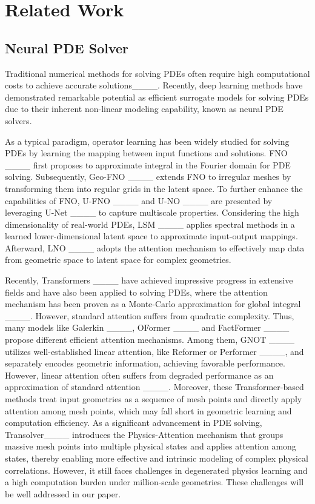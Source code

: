 \section{Related Work}
\vspace{-2pt}
\subsection{Neural PDE Solver}
Traditional numerical methods for solving PDEs often require high computational costs to achieve accurate solutions____. Recently, deep learning methods have demonstrated remarkable potential as efficient surrogate models for solving PDEs due to their inherent non-linear modeling capability, known as neural PDE solvers.

As a typical paradigm, operator learning has been widely studied for solving PDEs by learning the mapping between input functions and solutions. FNO ____ first proposes to approximate integral in the Fourier domain for PDE solving. Subsequently, Geo-FNO ____ extends FNO to irregular meshes by transforming them into regular grids in the latent space. To further enhance the capabilities of FNO, U-FNO ____ and U-NO ____ are presented by leveraging U-Net ____ to capture multiscale properties. Considering the high dimensionality of real-world PDEs, LSM ____ applies spectral methods in a learned lower-dimensional latent space to approximate input-output mappings. Afterward, LNO ____ adopts the attention mechanism to effectively map data from geometric space to latent space for complex geometries.

Recently, Transformers ____ have achieved impressive progress in extensive fields and have also been applied to solving PDEs, where the attention mechanism has been proven as a Monte-Carlo approximation for global integral ____. However, standard attention suffers from quadratic complexity. Thus, many models like Galerkin ____, OFormer ____ and FactFormer ____ propose different efficient attention mechanisms. Among them, GNOT ____ utilizes well-established linear attention, like Reformer or Performer ____, and separately encodes geometric information, achieving favorable performance. However, linear attention often suffers from degraded performance as an approximation of standard attention ____. Moreover, these Transformer-based methods treat input geometries as a sequence of mesh points and directly apply attention among mesh points, which may fall short in geometric learning and computation efficiency. As a significant advancement in PDE solving, Transolver____ introduces the Physics-Attention mechanism that groups massive mesh points into multiple physical states and applies attention among states, thereby enabling more effective and intrinsic modeling of complex physical correlations. However, it still faces challenges in degenerated physics learning and a high computation burden under million-scale geometries. These challenges will be well addressed in our paper.

